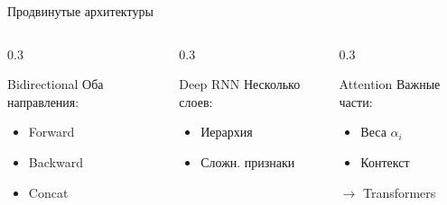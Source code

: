 \documentclass[aspectratio=169, 10pt]{beamer}
\begin{document}
\begin{frame}{Продвинутые архитектуры}
  \begin{columns}[T]
    \begin{column}{0.3\textwidth}
      \begin{block}{Bidirectional}
        \scriptsize
        Оба направления:
        \begin{itemize}
          \item Forward
          \item Backward
          \item Concat
        \end{itemize}
      \end{block}
    \end{column}
    
    \begin{column}{0.3\textwidth}
      \begin{block}{Deep RNN}
        \scriptsize
        Несколько слоев:
        \begin{itemize}
          \item Иерархия
          \item Сложн. признаки
        \end{itemize}
      \end{block}
    \end{column}
    
    \begin{column}{0.3\textwidth}
      \begin{block}{Attention}
        \scriptsize
        Важные части:
        \begin{itemize}
          \item Веса $\alpha_i$           \item Контекст
        \end{itemize}
        $\to$ Transformers
      \end{block}
    \end{column}
  \end{columns}
\end{frame}
\end{document}
